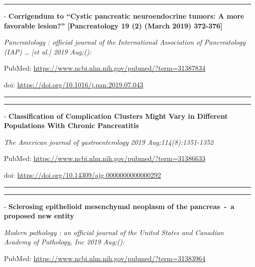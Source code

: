 \documentclass[]{article}
\begin{document}
\begin{center}\rule{0.5\linewidth}{\linethickness}\end{center}

 - \textbf{Corrigendum to ``Cystic pancreatic neuroendocrine tumors: A
more favorable lesion?'' {[}Pancreatology 19 (2) (March 2019)
372-376{]}}

\emph{Pancreatology : official journal of the International Association
of Pancreatology (IAP) \ldots{} {[}et al.{]} 2019 Aug;():}

PubMed: \url{https://www.ncbi.nlm.nih.gov/pubmed/?term=31387834}

doi: \url{https://doi.org/10.1016/j.pan.2019.07.043}

{}

{}

\begin{center}\rule{0.5\linewidth}{\linethickness}\end{center}

\begin{center}\rule{0.5\linewidth}{\linethickness}\end{center}

 - \textbf{Classification of Complication Clusters Might Vary in
Different Populations With Chronic Pancreatitis}

\emph{The American journal of gastroenterology 2019
Aug;114(8):1351-1352}

PubMed: \url{https://www.ncbi.nlm.nih.gov/pubmed/?term=31386633}

doi: \url{https://doi.org/10.14309/ajg.0000000000000292}

{}

{}

\begin{center}\rule{0.5\linewidth}{\linethickness}\end{center}

\begin{center}\rule{0.5\linewidth}{\linethickness}\end{center}

 - \textbf{Sclerosing epithelioid mesenchymal neoplasm of the
pancreas~-~a proposed new entity}

\emph{Modern pathology : an official journal of the United States and
Canadian Academy of Pathology, Inc 2019 Aug;():}

PubMed: \url{https://www.ncbi.nlm.nih.gov/pubmed/?term=31383964}
\end{document}
